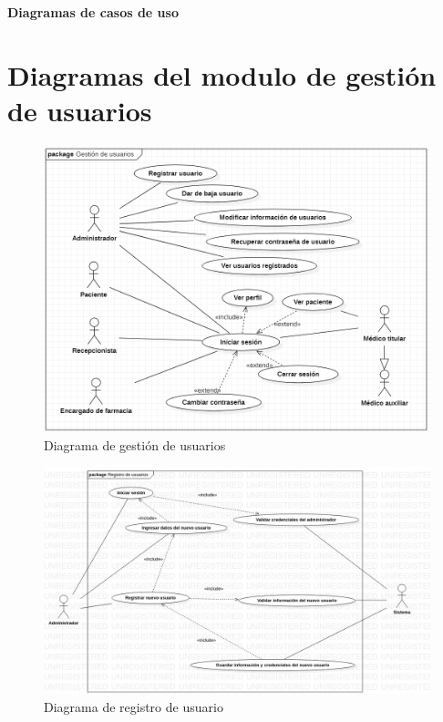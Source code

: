 \documentclass[12pt,letterpaper]{article}
\begin{document}
	{
		\begin{center}
			\par\vspace{0.5cm}
			{
				\Huge\textbf
				{
					Diagramas de casos de uso
				}
			}
        \end{center}
    \section{Diagramas del modulo de gestión de usuarios}
        \begin{figure}[H]
            \centering
            \includegraphics [scale=0.5]{gestionUsuarios}
            \caption{Diagrama de gestión de usuarios}
        \end{figure}
        \begin{figure}[H]
            \centering
            \includegraphics [scale=0.35]{alta_usuarios}
            \caption{Diagrama de registro de usuario}

\end{figure}}
\end{document}
